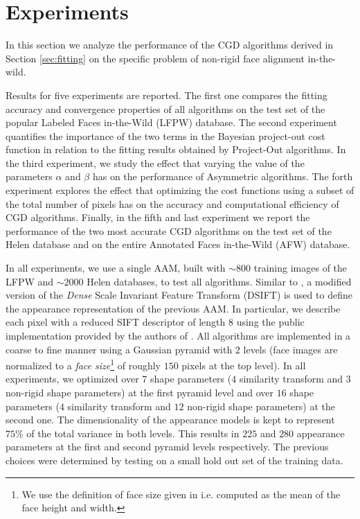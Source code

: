 \section{Experiments}
\label{sec:experiment}

In this section we analyze the performance of the CGD algorithms derived in Section \ref{sec:fitting} on the specific problem of non-rigid face alignment in-the-wild. 

Results for five experiments are reported. The first one compares the fitting accuracy and convergence properties of all algorithms on the test set of the popular Labeled Faces in-the-Wild (LFPW) \cite{Belhumeur2011} database. The second experiment quantifies the importance of the two terms in the Bayesian project-out cost function in relation to the fitting results obtained by Project-Out algorithms. In the third experiment, we study the effect that varying the value of the parameters $\alpha$ and $\beta$ has on the performance of Asymmetric algorithms. The forth experiment explores the effect that optimizing the cost functions using a subset of the total number of pixels has on the accuracy and computational efficiency of CGD algorithms. Finally, in the fifth and last experiment we report the performance of the two most accurate CGD algorithms on the test set of the Helen \cite{Le2012} database and on the entire Annotated Faces in-the-Wild (AFW) \cite{Zhu2012} database. 

In all experiments, we use a single AAM, built with $\sim800$ training images of the LFPW and $\sim2000$ Helen databases, to test all algorithms. Similar to \cite{Tzimiropoulos2014}, a modified version of the \emph{Dense} Scale Invariant Feature Transform (DSIFT) \cite{Lowe1999, Dalal2005} is used to define the appearance representation of the previous AAM. In particular, we describe each pixel with a reduced SIFT descriptor of length $8$ using the public implementation provided by the authors of \cite{Vedaldi2008vlfeat}. All algorithms are implemented in a coarse to fine manner using a Gaussian pyramid with $2$ levels (face images are normalized to a \emph{face size}\footnote{We use the definition of face size given in \cite{Zhu2012} i.e. computed as the mean of the face height and width.} of roughly $150$ pixels at the top level). In all experiments, we optimized over $7$ shape parameters ($4$ similarity transform and $3$ non-rigid shape parameters) at the first pyramid level and over $16$ shape parameters ($4$ similarity transform and $12$ non-rigid shape parameters) at the second one. The dimensionality of the appearance models is kept to represent $75\%$ of the total variance in both levels. This results in $225$ and $280$ appearance parameters at the first and second pyramid levels respectively. The previous choices were determined by testing on a small hold out set of the training data. 

